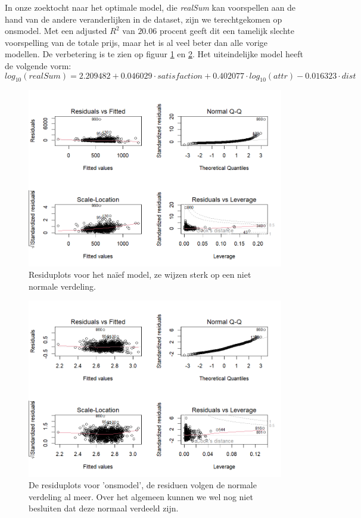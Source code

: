 \documentclass[a4paper]{kulakarticle}
\begin{document}
	In onze zoektocht naar het optimale model, die \textit{realSum} kan voorspellen aan de hand van de andere veranderlijken in de dataset, zijn we terechtgekomen op onsmodel. Met een adjusted $R^2$ van $20.06$ procent geeft dit een tamelijk slechte voorspelling van de totale prijs, maar het is al veel beter dan alle vorige modellen. De verbetering is te zien op figuur \ref{fig:naiefmodel} en \ref{fig:onsmodel}. Het uiteindelijke model heeft de volgende vorm:
	\begin{equation}
		log_{10}(\textit{realSum}) = 2.209482 + 0.046029\cdot \textit{satisfaction} + 0.402077\cdot log_{10}(\textit{attr}) -0.016323\cdot \textit{dist}
	\end{equation} 

 
	\begin{figure}
		\centering
		\includegraphics[width=0.9\linewidth]{Figuren/naiefmodel}
		\caption{Residuplots voor het naïef model, ze wijzen sterk op een niet normale verdeling.}
		\label{fig:naiefmodel}
	\end{figure}
	
	\begin{figure}
		\centering
		\includegraphics[width=0.9\linewidth]{Figuren/onsmodel}
		\caption{De residuplots voor 'onsmodel', de residuen volgen de normale verdeling al meer. Over het algemeen kunnen we wel nog niet besluiten dat deze normaal verdeeld zijn.}
		\label{fig:onsmodel}
	\end{figure}
	
\end{document}
